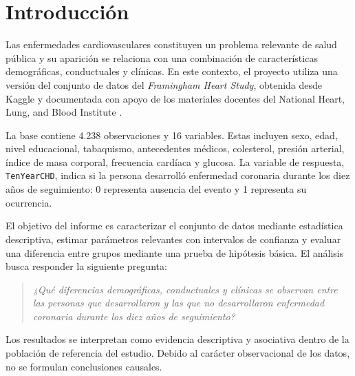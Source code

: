 \documentclass[11pt,a4paper]{article}
\begin{document}
\vspace{0.5em}
\tableofcontents
\newpage

\section{Introducción}

Las enfermedades cardiovasculares constituyen un problema relevante de salud pública y su aparición se relaciona con una combinación de características demográficas, conductuales y clínicas. En este contexto, el proyecto utiliza una versión del conjunto de datos del \textit{Framingham Heart Study}, obtenida desde Kaggle \cite{dileep} y documentada con apoyo de los materiales docentes del National Heart, Lung, and Blood Institute \cite{nhlbi}.

La base contiene 4.238 observaciones y 16 variables. Estas incluyen sexo, edad, nivel educacional, tabaquismo, antecedentes médicos, colesterol, presión arterial, índice de masa corporal, frecuencia cardíaca y glucosa. La variable de respuesta, \texttt{TenYearCHD}, indica si la persona desarrolló enfermedad coronaria durante los diez años de seguimiento: 0 representa ausencia del evento y 1 representa su ocurrencia.

El objetivo del informe es caracterizar el conjunto de datos mediante estadística descriptiva, estimar parámetros relevantes con intervalos de confianza y evaluar una diferencia entre grupos mediante una prueba de hipótesis básica. El análisis busca responder la siguiente pregunta:

\begin{quote}
\textit{¿Qué diferencias demográficas, conductuales y clínicas se observan entre las personas que desarrollaron y las que no desarrollaron enfermedad coronaria durante los diez años de seguimiento?}
\end{quote}

Los resultados se interpretan como evidencia descriptiva y asociativa dentro de la población de referencia del estudio. Debido al carácter observacional de los datos, no se formulan conclusiones causales.

\end{document}
